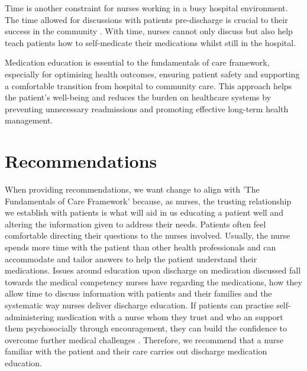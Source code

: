 \documentclass[british,12pt,a4paper]{article}
\begin{document}
Time is another constraint for nurses working in a busy hospital environment. The time allowed for discussions with patients pre-discharge is crucial to their success in the community \parencite{Sanjai2019}. With time, nurses cannot only discuss but also help teach patients how to self-medicate their medications whilst still in the hospital.

Medication education is essential to the fundamentals of care framework, especially for optimising health outcomes, ensuring patient safety and supporting a comfortable transition from hospital to community care. This approach helps the patient's well-being and reduces the burden on healthcare systems by preventing unnecessary readmissions and promoting effective long-term health management.

\section{Recommendations}
When providing recommendations, we want change to align with 'The Fundamentals of Care Framework' \parencite{Dempsey2013} because, as nurses, the trusting relationship we establish with patients is what will aid in us educating a patient well and altering the information given to address their needs. Patients often feel comfortable directing their questions to the nurses involved. Usually, the nurse spends more time with the patient than other health professionals and can accommodate and tailor answers to help the patient understand their medications. Issues around education upon discharge on medication discussed fall towards the medical competency nurses have regarding the medications, how they allow time to discuss information with patients and their families and the systematic way nurses deliver discharge education. If patients can practise self-administering medication with a nurse whom they trust and who an support them psychosocially through encouragement, they can build the confidence to overcome further medical challenges \parencite{Sanjai2019}. Therefore, we recommend that a nurse familiar with the patient and their care carries out discharge medication education.
\end{document}
